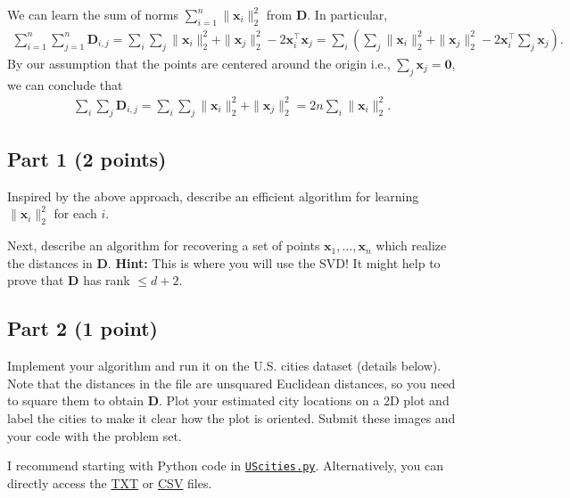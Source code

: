 \documentclass{article}
\begin{document}
We can learn the sum of norms $\sum_{i=1}^n \| \mathbf{x}_i\|_2^2$ from $\mathbf{D}$.
In particular,
\begin{align*}
\sum_{i=1}^n \sum_{j=1}^n \mathbf{D}_{i,j} = \sum_{i}\sum_{j}
\| \mathbf{x}_i \|_2^2  + \| \mathbf{x}_j \|_2^2 - 2 \mathbf{x}_i^\top \mathbf{x}_j =
\sum_{i} \left(\sum_{j} \| \mathbf{x}_i \|_2^2  + \| \mathbf{x}_j \|_2^2
- 2 \mathbf{x}_i^\top \sum_{j} \mathbf{x}_j \right).
\end{align*}
By our assumption that the points are centered around the origin i.e., $\sum_j \mathbf{x}_j = \mathbf{0}$, we can conclude that
\begin{align*}
\sum_{i}\sum_{j} \mathbf{D}_{i,j} = \sum_i \sum_j \| \mathbf{x}_i \|_2^2 + \| \mathbf{x}_j \|_2^2 = 2n \sum_i \| \mathbf{x}_i \|_2^2.
\end{align*}

\subsection*{Part 1 (2 points)}
Inspired by the above approach, describe an efficient algorithm for learning $\| \mathbf{x}_i \|_2^2$ for each $i$.

Next, describe an algorithm for recovering a set of points $\mathbf{x}_1,\ldots, \mathbf{x}_n$ which realize the distances in $\mathbf{D}$.
\textbf{Hint:} This is where you will use the SVD! It might help to prove that $\mathbf{D}$ has rank $\leq d + 2$.

\subsection*{Part 2 (1 point)}
Implement your algorithm and run it on the U.S. cities dataset (details below).
Note that the distances in the file are unsquared Euclidean distances, so you need to square them to obtain $\mathbf{D}$. Plot your  estimated city locations on a 2D plot and label the cities to make it clear how the plot is oriented. Submit these images and your code with the problem set.

I recommend starting with Python code in \href{https://www.rtealwitter.com/rads2024/psets/UScities.py}{\texttt{UScities.py}}.
Alternatively, you can directly access the \href{https://www.rtealwitter.com/rads2024/psets/UScities.txt}{TXT}
or
\href{https://www.rtealwitter.com/rads2024/psets/UScities.csv}{CSV} files.


%
\end{document}
